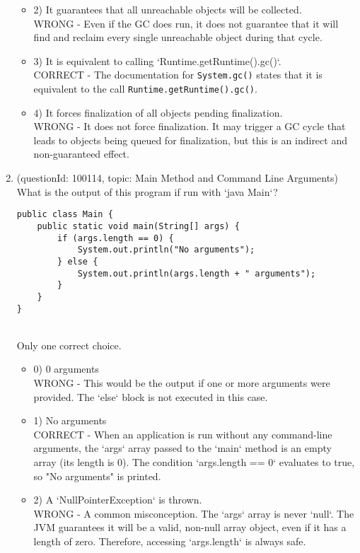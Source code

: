 \documentclass[12pt]{article}
\begin{document}
\begin{enumerate}[label=(\arabic*)]
\begin{itemize}
\item 2) It guarantees that all unreachable objects will be collected.
 \\ 
WRONG - Even if the GC does run, it does not guarantee that it will find and reclaim every single unreachable object during that cycle.

\item 3) It is equivalent to calling `Runtime.getRuntime().gc()`.
 \\ 
CORRECT - The documentation for \verb|System.gc()| states that it is equivalent to the call \verb|Runtime.getRuntime().gc()|.

\item 4) It forces finalization of all objects pending finalization.
 \\ 
WRONG - It does not force finalization. It may trigger a GC cycle that leads to objects being queued for finalization, but this is an indirect and non-guaranteed effect.

\end{itemize}
\item (questionId: 100114, topic: Main Method and Command Line Arguments) \\ 
What is the output of this program if run with `java Main`?
\begin{verbatim}
public class Main {
    public static void main(String[] args) {
        if (args.length == 0) {
            System.out.println("No arguments");
        } else {
            System.out.println(args.length + " arguments");
        }
    }
}
\end{verbatim}
\\ \noindent Only one correct choice. 
\begin{itemize}
\item 0) 0 arguments
 \\ 
WRONG - This would be the output if one or more arguments were provided. The `else` block is not executed in this case.

\item 1) No arguments
 \\ 
CORRECT - When an application is run without any command-line arguments, the `args` array passed to the `main` method is an empty array (its length is 0). The condition `args.length == 0` evaluates to true, so "No arguments" is printed.

\item 2) A `NullPointerException` is thrown.
 \\ 
WRONG - A common misconception. The `args` array is never `null`. The JVM guarantees it will be a valid, non-null array object, even if it has a length of zero. Therefore, accessing `args.length` is always safe.


\end{itemize}
\end{enumerate}
\end{document}

